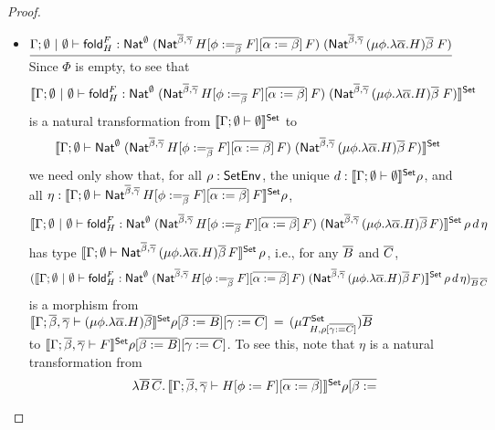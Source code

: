 \documentclass[runningheads]{llncs}
\newcommand{\set}{\mathsf{Set}}
\newcommand{\fold}{\mathsf{fold}}
\begin{document}
\begin{proof}
\begin{itemize}
\item
$\underline{\Gamma; \emptyset~|~\emptyset \vdash \fold^F_H :
  \Nat^\emptyset\;(\Nat^{\ol{\beta}, \ol{\gamma}}\,H[\phi
    :=_{\ol{\beta}} F][\ol{\alpha := \beta}]\,F)\;
  (\Nat^{{\ol{\beta},\ol{\gamma}} }\,(\mu \phi.\lambda \overline
  \alpha.H)\overline \beta \;F)}$ \; Since $\Phi$ is empty, to see
  that 
  $$\setsem{ \Gamma; \emptyset~|~\emptyset \vdash \fold^F_H :
    \Nat^\emptyset\;(\Nat^{\ol{\beta}, \ol{\gamma}}\,H[\phi
      :=_{\ol{\beta}} F][\ol{\alpha := \beta}]\,F)\;
    (\Nat^{{\ol{\beta},\ol{\gamma}} }\,(\mu \phi.\lambda \overline
    \alpha.H)\overline \beta \;F)}$$
    is a natural transformation from
  $\setsem{\Gamma;\emptyset \vdash \emptyset}$ to \[\setsem{\Gamma;
    \emptyset \vdash \Nat^\emptyset\;(\Nat^{\ol{\beta},
      \ol{\gamma}}\,H[\phi :=_{\ol{\beta}} F][\ol{\alpha :=
        \beta}]\,F)\; (\Nat^{{\ol{\beta},\ol{\gamma}} }\,(\mu
    \phi.\lambda \overline \alpha.H)\overline \beta\,F)}\] we need only
  show that, for all $\rho : \mathsf{SetEnv}$, the unique $d :
  \setsem{\Gamma;\emptyset \vdash \emptyset} \rho$, and all $\eta :
  \setsem{\Gamma; \emptyset \vdash \Nat^{\ol{\beta},
      \ol{\gamma}}\,H[\phi :=_{\ol{\beta}} F][\ol{\alpha :=
        \beta}]\,F} \rho$,
\[ \setsem{\Gamma; \emptyset~|~\emptyset \vdash \fold^F_H :
  \Nat^\emptyset\;(\Nat^{\ol{\beta}, \ol{\gamma}}\,H[\phi
    :=_{\ol{\beta}} F][\ol{\alpha := \beta}]\,F)\;
  (\Nat^{{\ol{\beta},\ol{\gamma}} }\,(\mu \phi.\lambda \overline
  \alpha.H)\overline \beta\,F)}\,\rho\,d\,\eta\] has type
$\setsem{\Gamma; \emptyset \vdash \Nat^{{\ol{\beta},\ol{\gamma}}
  }\,(\mu \phi.\lambda \overline \alpha.H)\overline \beta\,F}\,\rho$,
i.e., for any $\overline{B}$ and $\overline{C}$,
\[(\setsem{\Gamma; \emptyset~|~\emptyset \vdash \fold^F_H :
  \Nat^\emptyset\;(\Nat^{\ol{\beta}, \ol{\gamma}}\,H[\phi
    :=_{\ol{\beta}} F][\ol{\alpha := \beta}]\,F)\;
  (\Nat^{{\ol{\beta},\ol{\gamma}} }\,(\mu \phi.\lambda \overline
  \alpha.H)\overline \beta\,F)}\,\rho\,d\,\eta)_{\ol{B}\,\ol{C}}\] is a
morphism from $\setsem{\Gamma; \ol{\beta},\ol{\gamma} \vdash (\mu
  \phi.\lambda \overline \alpha.H)\overline \beta}\rho[\ol{\beta :=
    B}][\ol{\gamma := C}] \,=\,(\mu T^\set_{H,\rho[\ol{\gamma := C}]})
\ol{B}$\\ to $\setsem{\Gamma; \ol{\beta},\ol{\gamma} \vdash
  F}\rho[\ol{\beta := B}][\ol{\gamma := C}]$.  To see this, note
that $\eta$ is a natural transformation from
\[\begin{array}{ll}
 & \lambda \ol{B}\,\ol{C}.\,\setsem{\Gamma; \ol{\beta},\ol{\gamma}
  \vdash H[\phi := F][\ol{\alpha := \beta}]}\rho[\ol{\beta :=
}
\end{array}\]
\end{itemize}
\end{proof}
\end{document}
